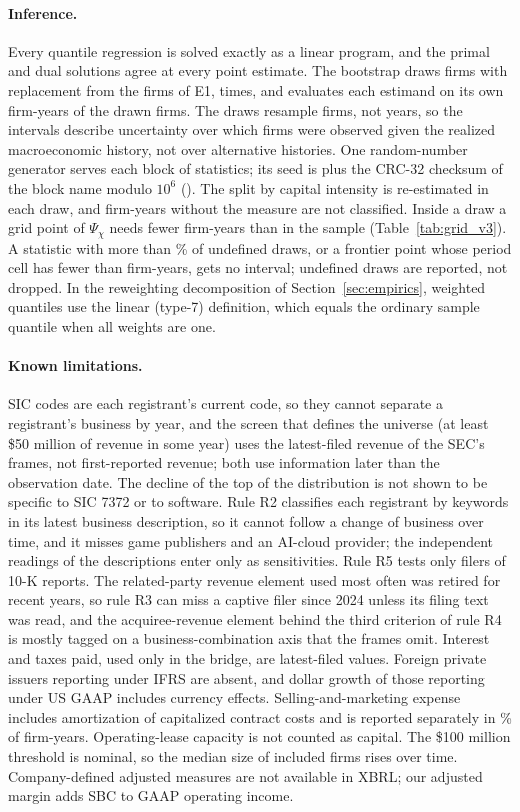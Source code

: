 \paragraph{Inference.}\label{app:data-inference} Every quantile regression is solved exactly as a linear program, and the primal and dual solutions agree at every point estimate. The bootstrap draws firms with replacement from the \BootFirms{} firms of E1, \BootB{} times, and evaluates each estimand on its own firm-years of the drawn firms. The draws resample firms, not years, so the intervals describe uncertainty over which firms were observed given the realized macroeconomic history, not over alternative histories. One random-number generator serves each block of statistics; its seed is \BootSeedZero{} plus the CRC-32 checksum of the block name modulo $10^6$ (\BootSeeds). The split by capital intensity is re-estimated in each draw, and firm-years without the measure are not classified. Inside a draw a grid point of $\Psi_\chi$ needs fewer firm-years than in the sample (Table~\ref{tab:grid_v3}). A statistic with more than \BootNanMax\% of undefined draws, or a frontier point whose period cell has fewer than \BootMinCell{} firm-years, gets no interval; undefined draws are reported, not dropped. In the reweighting decomposition of Section~\ref{sec:empirics}, weighted quantiles use the linear (type-7) definition, which equals the ordinary sample quantile when all weights are one.

\paragraph{Known limitations.} SIC codes are each registrant's current code, so they cannot separate a registrant's business by year, and the screen that defines the universe (at least \$50 million of revenue in some year) uses the latest-filed revenue of the SEC's frames, not first-reported revenue; both use information later than the observation date. The decline of the top of the distribution is not shown to be specific to SIC 7372 or to software. Rule R2 classifies each registrant by keywords in its latest business description, so it cannot follow a change of business over time, and it misses game publishers and an AI-cloud provider; the independent readings of the descriptions enter only as sensitivities. Rule R5 tests only filers of 10-K reports. The related-party revenue element used most often was retired for recent years, so rule R3 can miss a captive filer since 2024 unless its filing text was read, and the acquiree-revenue element behind the third criterion of rule R4 is mostly tagged on a business-combination axis that the frames omit. Interest and taxes paid, used only in the bridge, are latest-filed values. Foreign private issuers reporting under IFRS are absent, and dollar growth of those reporting under US GAAP includes currency effects. Selling-and-marketing expense includes amortization of capitalized contract costs and is reported separately in \VSmShare\% of firm-years. Operating-lease capacity is not counted as capital. The \$100 million threshold is nominal, so the median size of included firms rises over time. Company-defined adjusted measures are not available in XBRL; our adjusted margin adds SBC to GAAP operating income.


